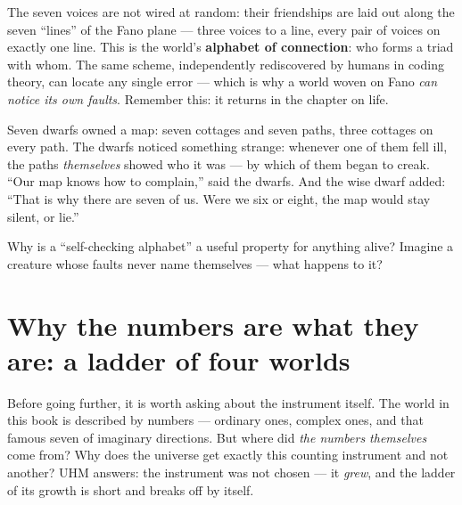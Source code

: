 \documentclass[11pt,letterpaper]{article}
\begin{document}
The seven voices are not wired at random: their friendships are laid
out along the seven ``lines'' of the Fano plane --- three voices to a
line, every pair of voices on exactly one line. This is the world's
\textbf{alphabet of connection}: who forms a triad with whom. The same
scheme, independently rediscovered by humans in coding theory, can
locate any single error --- which is why a world woven on Fano
\emph{can notice its own faults}. Remember this: it returns in the
chapter on life.

\begin{talebox}
Seven dwarfs owned a map: seven cottages and seven paths, three
cottages on every path. The dwarfs noticed something strange: whenever
one of them fell ill, the paths \emph{themselves} showed who it was
--- by which of them began to creak. ``Our map knows how to
complain,'' said the dwarfs. And the wise dwarf added: ``That is why
there are seven of us. Were we six or eight, the map would stay
silent, or lie.''
\end{talebox}

\begin{askbox}
Why is a ``self-checking alphabet'' a useful property for anything
alive? Imagine a creature whose faults never name themselves --- what
happens to it?
\end{askbox}

\section{Why the numbers are what they are: a ladder of four worlds}
\label{sec:numbers}

Before going further, it is worth asking about the instrument itself.
The world in this book is described by numbers --- ordinary ones,
complex ones, and that famous seven of imaginary directions. But where
did \emph{the numbers themselves} come from? Why does the universe get
exactly this counting instrument and not another? UHM answers: the
instrument was not chosen --- it \emph{grew}, and the ladder of its
growth is short and breaks off by itself.
\end{document}
